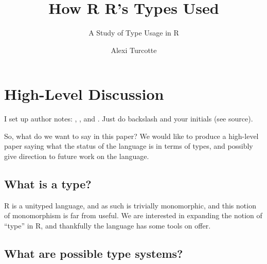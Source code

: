 \documentclass[acmsmall,10pt,review,anonymous]{acmart}\settopmatter{printfolios=true,printccs=false,printacmref=false}
\begin{document}
\title{How R R's Types Used}
\subtitle{A Study of Type Usage in R}


\author{Alexi Turcotte}



\begin{abstract}

\end{abstract}



\maketitle


\section{High-Level Discussion}

I set up author notes:
, , and .
Just do backslash and your initials (see source).

So, what do we want to say in this paper?
We would like to produce a high-level paper saying what the status of the language is in terms of types, and possibly give direction to future work on the language.

\subsection{What is a type?}


R is a unityped language, and as such is trivially monomorphic, and this notion of monomorphism is far from useful.
We are interested in expanding the notion of ``type'' in R, and thankfully the language has some tools on offer.

\subsection{What are possible type systems?}
\end{document}

